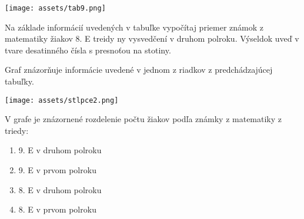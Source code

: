 \begin{center}
	\texttt{[image: assets/tab9.png]}
\end{center}

\begin{example}
	Na základe informácií uvedených v tabuľke vypočítaj priemer známok z matematiky žiakov 8. E treidy ny vysvedčení v druhom polroku. Výseldok uveď v tvare desatinného čísla s presnoťou na stotiny.
\end{example}

\begin{example}
	Graf znázorňuje informácie uvedené v jednom z riadkov z predchádzajúcej tabuľky.
	
	\begin{center}
		\texttt{[image: assets/stlpce2.png]}
	\end{center}
	
	V grafe je znázornené rozdelenie počtu žiakov podľa známky z matematiky z triedy:
	
	\begin{enumerate}
		\item 9. E v druhom polroku
		\item 9. E v prvom polroku
		\item 8. E v druhom polroku
		\item 8. E v prvom polroku
	\end{enumerate}
\end{example}